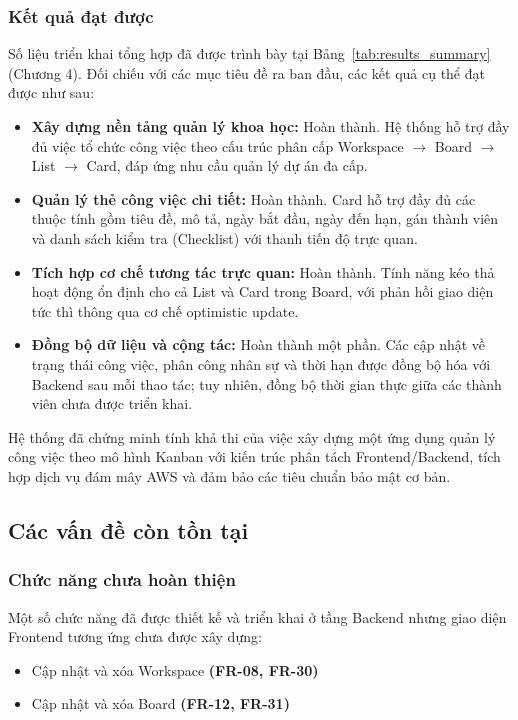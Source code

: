 \subsubsection{Kết quả đạt được}

Số liệu triển khai tổng hợp đã được trình bày tại Bảng~\ref{tab:results_summary} (Chương 4). Đối chiếu với các mục tiêu đề ra ban đầu, các kết quả cụ thể đạt được như sau:

\begin{itemize}
    \item \textbf{Xây dựng nền tảng quản lý khoa học:} Hoàn thành. Hệ thống hỗ trợ đầy đủ việc tổ chức công việc theo cấu trúc phân cấp Workspace $\rightarrow$ Board $\rightarrow$ List $\rightarrow$ Card, đáp ứng nhu cầu quản lý dự án đa cấp.
    \item \textbf{Quản lý thẻ công việc chi tiết:} Hoàn thành. Card hỗ trợ đầy đủ các thuộc tính gồm tiêu đề, mô tả, ngày bắt đầu, ngày đến hạn, gán thành viên và danh sách kiểm tra (Checklist) với thanh tiến độ trực quan.
    \item \textbf{Tích hợp cơ chế tương tác trực quan:} Hoàn thành. Tính năng kéo thả hoạt động ổn định cho cả List và Card trong Board, với phản hồi giao diện tức thì thông qua cơ chế optimistic update.
    \item \textbf{Đồng bộ dữ liệu và cộng tác:} Hoàn thành một phần. Các cập nhật về trạng thái công việc, phân công nhân sự và thời hạn được đồng bộ hóa với Backend sau mỗi thao tác; tuy nhiên, đồng bộ thời gian thực giữa các thành viên chưa được triển khai.
\end{itemize}

Hệ thống đã chứng minh tính khả thi của việc xây dựng một ứng dụng quản lý công việc theo mô hình Kanban với kiến trúc phân tách Frontend/Backend, tích hợp dịch vụ đám mây AWS và đảm bảo các tiêu chuẩn bảo mật cơ bản.

\subsection{Các vấn đề còn tồn tại}

\subsubsection{Chức năng chưa hoàn thiện}

Một số chức năng đã được thiết kế và triển khai ở tầng Backend nhưng giao diện Frontend tương ứng chưa được xây dựng:

\begin{itemize}
    \item Cập nhật và xóa Workspace \textbf{(FR-08, FR-30)} 
    \item Cập nhật và xóa Board \textbf{(FR-12, FR-31)}
\end{itemize}

